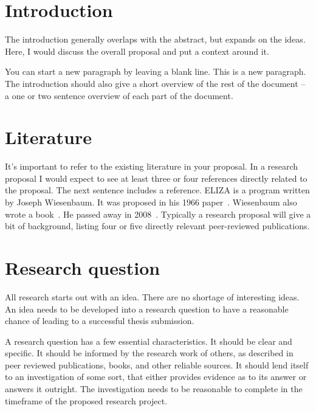   \section{Introduction}
    The introduction generally overlaps with the abstract, but expands
    on the ideas. Here, I would discuss the overall proposal and put a context
    around it.
    
    You can start a new paragraph by leaving a blank line. This is a new
    paragraph.
    The introduction should also give a short overview of the rest of the
    document -- a one or two sentence overview of each part of the document.

  \section{Literature}
    It's important to refer to the existing literature in your proposal. In a
    research proposal I would expect to see at least three or four references
    directly related to the proposal. The next sentence includes a reference.
    ELIZA is a program written by Joseph Wiesenbaum. It was proposed in his 1966
    paper~\cite{weisenbaumeliza}.
    Wiesenbaum also wrote a book~\cite{weisenbaumcomputerpower}.
    He passed away in 2008~\cite{weisenbaumnytobituary}.
    \label{section:literature}
    Typically a research proposal will give a bit of background, listing four or
    five directly relevant peer-reviewed publications.

  \section{Research question}
    All research starts out with an idea. There are no shortage of interesting 
    ideas. An idea needs to be developed into a research question to have a
    reasonable chance of leading to a successful thesis submission.
    
    A research question has a few essential characteristics. It should be clear 
    and specific. It should be informed by the research work of others, as
    described in peer reviewed publications, books, and other reliable sources.
    It should lend itself to an investigation of some sort, that either provides
    evidence as to its answer or answers it outright. The investigation needs to
    be reasonable to complete in the timeframe of the proposed research project.

